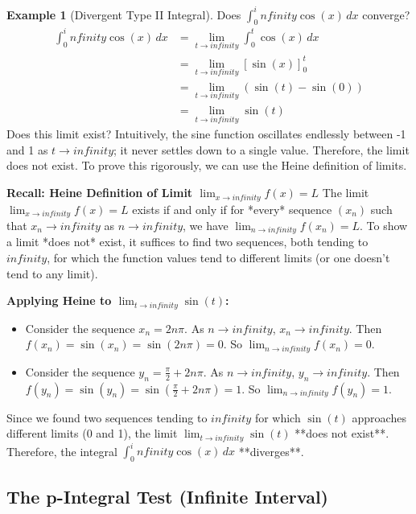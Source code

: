 \documentclass[11pt]{article}
\def\infty{infinity}%
\theoremstyle{definition}
\newtheorem{example}[theorem]{Example}
\newcommand{\dx}{\, dx} %
\begin{document}
\begin{example}[Divergent Type II Integral] \label{ex:cos_infty}
    Does $\int_0^\infty \cos(x) \dx$ converge?
    \begin{align*} \int_0^\infty \cos(x) \dx &= \lim_{t \to \infty} \int_0^t \cos(x) \dx \\ &= \lim_{t \to \infty} \left[ \sin(x) \right]_0^t \\ &= \lim_{t \to \infty} (\sin(t) - \sin(0)) \\ &= \lim_{t \to \infty} \sin(t) \end{align*}
    Does this limit exist? Intuitively, the sine function oscillates endlessly between -1 and 1 as $t \to \infty$; it never settles down to a single value. Therefore, the limit does not exist.
    To prove this rigorously, we can use the Heine definition of limits.

    \textbf{Recall: Heine Definition of Limit $\lim_{x\to\infty} f(x) = L$}
    The limit $\lim_{x\to\infty} f(x) = L$ exists if and only if for *every* sequence $(x_n)$ such that $x_n \to \infty$ as $n \to \infty$, we have $\lim_{n\to\infty} f(x_n) = L$.
    To show a limit *does not* exist, it suffices to find two sequences, both tending to $\infty$, for which the function values tend to different limits (or one doesn't tend to any limit).

    \textbf{Applying Heine to $\lim_{t \to \infty} \sin(t)$:}
    \begin{itemize}
        \item Consider the sequence $x_n = 2n\pi$. As $n \to \infty$, $x_n \to \infty$.
          Then $f(x_n) = \sin(x_n) = \sin(2n\pi) = 0$. So $\lim_{n\to\infty} f(x_n) = 0$.
        \item Consider the sequence $y_n = \frac{\pi}{2} + 2n\pi$. As $n \to \infty$, $y_n \to \infty$.
          Then $f(y_n) = \sin(y_n) = \sin(\frac{\pi}{2} + 2n\pi) = 1$. So $\lim_{n\to\infty} f(y_n) = 1$.
    \end{itemize}
    Since we found two sequences tending to $\infty$ for which $\sin(t)$ approaches different limits (0 and 1), the limit $\lim_{t \to \infty} \sin(t)$ **does not exist**.
    Therefore, the integral $\int_0^\infty \cos(x) \dx$ **diverges**.
\end{example}

\subsection{The p-Integral Test (Infinite Interval)}
\end{document}
